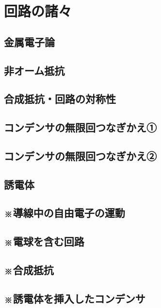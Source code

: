 \documentclass[../../uem_phy_std_q.tex]{subfiles}
\begin{document}
    \section{回路の諸々}
    \subsection{金属電子論}
        
        \vspace{20pt}
        \vfill
    \subsection{非オーム抵抗}
        
        \vspace{20pt}
        \vfill
    \subsection{合成抵抗・回路の対称性}
        
        \vspace{20pt}
        \vfill
    \subsection{コンデンサの無限回つなぎかえ①}
        
        \vspace{20pt}
        \vfill 
    \subsection{コンデンサの無限回つなぎかえ②}
           
        \vspace{20pt}
        \vfill
    \subsection{誘電体}
        
        \vspace{20pt}
        \vfill
    \subsection{※導線中の自由電子の運動}
        
        \vspace{20pt}
        \vfill
    \subsection{※電球を含む回路}
        
        \vspace{20pt}
        \vfill
    \subsection{※合成抵抗}
        
        \vspace{20pt}
        \vfill
    \subsection{※誘電体を挿入したコンデンサ}
        
        \vspace{20pt}
        \vfill
\end{document}
